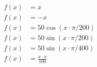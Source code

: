 \documentclass{article}
\begin{document}
\begin{equation}
\begin{split}
f(x) & = x\\
f(x) & = -x\\
f(x) & = 50 \cos (x \cdot \pi / 200)\\
f(x) & = 50 \sin (x \cdot \pi / 200)\\
f(x) & = 50 \sin (x \cdot \pi / 400)\\
f(x) & = \frac{x \cdot x}{100}\\
\end{split}
\end{equation}
\end{document}
